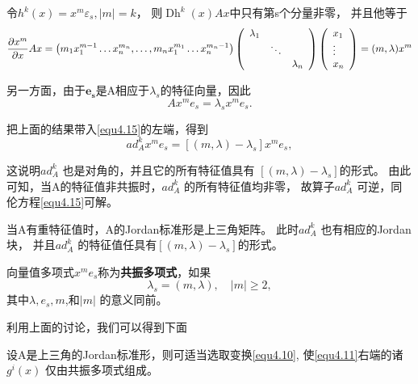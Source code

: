令$h ^ { k } ( x ) = x ^ { m } \varepsilon _ { s } , | m | = k$，
则$\operatorname { Dh } ^ { k } ( x ) A x$中只有第s个分量非零，
并且他等于
\[
  \frac { \partial x ^ { m } } { \partial x } A x
  =\left( m _ { 1 } x _ { 1 } ^ { m - 1 } \dots x _ { n } ^ { m_n } , \dots , m _ { n } x _ { 1 } ^ { m_1 } \dots x _ { n } ^ { m_n - 1 } \right)
  \left(
    \begin{array} { c c c }
      { \lambda _ { 1 } } & { } & { } \\
      { } & { \ddots } & { } \\
      { } & { } & { \lambda _ { n } }
    \end{array}
  \right)
  \left(
    \begin{array} { l }
      { x _ { 1 } } \\
      { \vdots } \\
      { x _ { n } }
    \end{array}
  \right)
  =( m , \lambda ) x ^ { m }
\]

另一方面，由于$\boldsymbol { e } _ { \mathbf { s } }$是A相应于\(\lambda_s\)的特征向量，因此
\[
A x ^ { m } e _ { s } = \lambda _ { s } x ^ { m } e _ { s }.
\]

把上面的结果带入\ref{equ4.15}的左端，得到
\begin{equation}
a d _ { A } ^ { k } x ^ { m } e _ { s } = \left[ ( m , \lambda ) - \lambda _ { s } \right] x ^ { m } e _ { s },
  \label{eq:1.4.17}
\end{equation}

这说明\(ad_A^k\) 也是对角的，并且它的所有特征值具有
$\left[ ( m , \lambda ) - \lambda _ { s } \right]$的形式。
由此可知，当A的特征值非共振时，\(ad_A^k\) 的所有特征值均非零，
故算子\(ad_A^k\) 可逆，同伦方程\ref{equ4.15}可解。

当A有重特征值时，A的Jordan标准形是上三角矩阵。
此时\(ad_A^k\) 也有相应的Jordan块，
并且\(ad_A^k\) 的特征值任具有$\left[ ( m , \lambda ) - \lambda _ { s } \right]$的形式。

\begin{defination}
  向量值多项式$x ^ { m } e _ { s }$称为\textbf{共振多项式}，如果
  \[
\lambda _ { s } = ( m , \lambda ) , \quad | m | \geqslant 2,
\]
其中\(\lambda,e_s,m\),和\(|m|\) 的意义同前。
  \label{def:1.4.5}
\end{defination}

利用上面的讨论，我们可以得到下面

\begin{theorem}
  设A是上三角的Jordan标准形，则可适当选取变换\ref{equ4.10},
  使\ref{equ4.11}右端的诸\(g^i(x)\) 仅由共振多项式组成。

\end{theorem}

